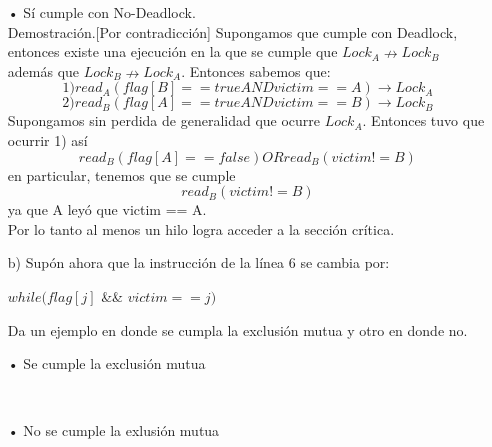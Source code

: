 \documentclass[12pt, letterpaper]{article}
\begin{document}
\begin{itemize}
\begin{itemize}
\item[•] Sí cumple con No-Deadlock.\\
Demostración.[Por contradicción]
Supongamos que cumple con Deadlock, entonces existe una ejecución en la que se cumple que $Lock_A \nrightarrow Lock_B$ además que $Lock_B \nrightarrow Lock_A$.
Entonces sabemos que:
$$1)read_A(flag[B]== true AND victim == A) \rightarrow Lock_A$$
$$2)read_B(flag[A]== true AND victim == B) \rightarrow Lock_B$$
Supongamos sin perdida de generalidad que ocurre $Lock_A$. Entonces tuvo que ocurrir 1) así 
$$read_B(flag[A] == false) OR read_B(victim != B)$$
en particular, tenemos que se cumple
$$read_B(victim != B)$$ ya que A leyó que victim == A.\\
Por lo tanto al menos un hilo logra acceder a la sección crítica.
\item[b) ]Sup\'on ahora que la instrucci\'on de la l\'inea 6 se cambia por:
\begin{center}
$while(flag[j]$ \&\& $victim == j)$
\end{center}
Da un ejemplo en donde se cumpla la exclusi\'on mutua y otro en donde no.

\item[•] Se cumple la exclusión mutua

\\

\item[•] No se cumple la exlusión mutua


\end{itemize}
\end{itemize}
\end{document}
